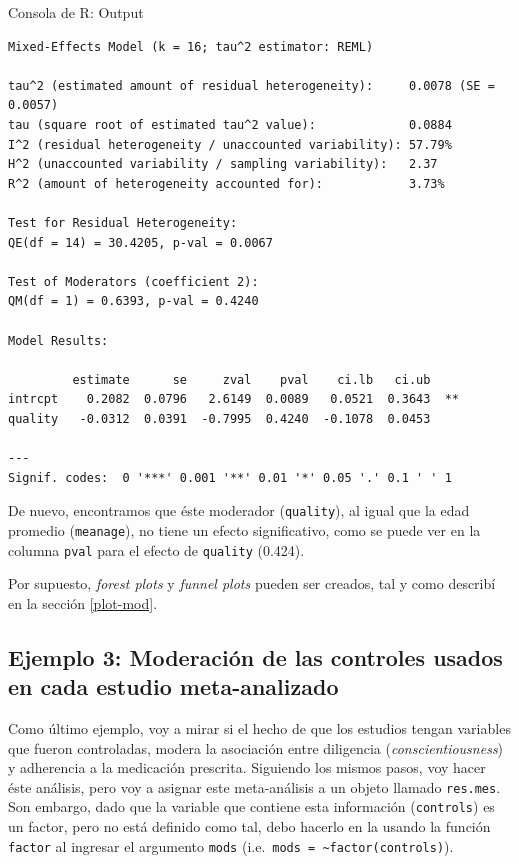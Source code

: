 \documentclass[
  bookmarksnumbered]{article}
\begin{document}
\begin{ROut}{Consola de R: Output~\thetcbcounter}
                \begin{footnotesize}
                \begin{verbatim} 
Mixed-Effects Model (k = 16; tau^2 estimator: REML)

tau^2 (estimated amount of residual heterogeneity):     0.0078 (SE = 0.0057)
tau (square root of estimated tau^2 value):             0.0884
I^2 (residual heterogeneity / unaccounted variability): 57.79%
H^2 (unaccounted variability / sampling variability):   2.37
R^2 (amount of heterogeneity accounted for):            3.73%

Test for Residual Heterogeneity:
QE(df = 14) = 30.4205, p-val = 0.0067

Test of Moderators (coefficient 2):
QM(df = 1) = 0.6393, p-val = 0.4240

Model Results:

         estimate      se     zval    pval    ci.lb   ci.ub 
intrcpt    0.2082  0.0796   2.6149  0.0089   0.0521  0.3643  ** 
quality   -0.0312  0.0391  -0.7995  0.4240  -0.1078  0.0453     

---
Signif. codes:  0 '***' 0.001 '**' 0.01 '*' 0.05 '.' 0.1 ' ' 1
 \end{verbatim}
                \end{footnotesize}
                \end{ROut}

De nuevo, encontramos que éste moderador (\texttt{quality}), al igual que la edad promedio (\texttt{meanage}), no tiene un efecto significativo, como se puede ver en la columna \texttt{pval} para el efecto de \texttt{quality} (0.424).

Por supuesto, \emph{forest plots} y \emph{funnel plots} pueden ser creados, tal y como describí en la sección \ref{plot-mod}.

\hypertarget{ejemplo-3-moderaciuxf3n-de-las-controles-usados-en-cada-estudio-meta-analizado}{%
\subsection{Ejemplo 3: Moderación de las controles usados en cada estudio meta-analizado}\label{ejemplo-3-moderaciuxf3n-de-las-controles-usados-en-cada-estudio-meta-analizado}}

Como último ejemplo, voy a mirar si el hecho de que los estudios tengan variables que fueron controladas, modera la asociación entre diligencia (\emph{conscientiousness}) y adherencia a la medicación prescrita. Siguiendo los mismos pasos, voy hacer éste análisis, pero voy a asignar este meta-análisis a un objeto llamado \texttt{res.mes}. Son embargo, dado que la variable que contiene esta información (\texttt{controls}) es un factor, pero no está definido como tal, debo hacerlo en la usando la función \texttt{factor} al ingresar el argumento \texttt{mods} (i.e.~\texttt{mods\ =\ \textasciitilde{}factor(controls)}).
\end{document}

